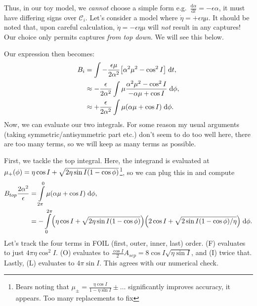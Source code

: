 \documentclass[11pt,
        usenames, %
        dvipsnames %
    ]{article}
\newcommand*{\rd}[2]{\frac{\mathrm{d}#1}{\mathrm{d}#2}}
\DeclarePairedDelimiter\p{\lparen}{\rparen}
\DeclarePairedDelimiter\s{\lbrack}{\rbrack}
\begin{document}
Thus, in our toy model, we \emph{cannot} choose a simple form e.g.\
$\rd{\alpha}{t} = -\epsilon\alpha$, it must have differing signs over
$\mathcal{C}_i$. Let's consider a model where $\dot{\eta} = +\epsilon \eta \mu$.
It should be noted that, upon careful calculation, $\dot{\eta} = -\epsilon \eta
\mu$ will \emph{not} result in any captures! Our choice only permits captures
\emph{from top down}. We will see this below.

Our expression then becomes:
\begin{align*}
    B_i &= \int -\frac{\epsilon \mu}{2\alpha^2}\s*{
        \alpha^2 \mu^2 - \cos^2 I}\;\mathrm{d}t,\\
        &\approx -\frac{\epsilon}{2\alpha^2} \int
            \mu \frac{\alpha^2 \mu^2 - \cos^2 I}{
                -\alpha \mu + \cos I}\;\mathrm{d}\phi,\\
        &\approx +\frac{\epsilon}{2\alpha^2}\int
            \mu\p*{\alpha \mu + \cos I}\;\mathrm{d}\phi.
\end{align*}
Now, we can evaluate our two integrals. For some reason my usual arguments
(taking symmetric/antisymmetric part etc.) don't seem to do too well here, there
are too many terms, so we will keep as many terms as possible.

First, we tackle the top integral. Here, the integrand is evaluated at
$\mu_+(\phi) = \eta \cos I + \sqrt{2\eta \sin I\p*{1 - \cos \phi}}$\footnote{
Bears noting that $\mu_{\pm} = \frac{\eta \cos I}{1 - \eta \sin I} \pm \dots$
significantly improves accuracy, it appears. Too many replacements to fix}, so
we can plug this in and compute
\begin{align*}
    B_{top}\frac{2\alpha^2}{\epsilon} &= \int\limits_{2\pi}^{0}
            \mu(\alpha \mu + \cos I)\;\mathrm{d}\phi,\\
        &= -\int\limits_0^{2\pi}
            \p*{\eta \cos I + \sqrt{2\eta \sin I\p*{1 - \cos \phi}}}
                \p*{2\cos I + \sqrt{2\sin I\p*{1 - \cos \phi}/\eta}}
                \;\mathrm{d}\phi.
\end{align*}
Let's track the four terms in FOIL (first, outer, inner, last) order. (F)
evaluates to just $4\pi \eta \cos^2 I$. (O) evaluates to $\frac{\cos
I}{2}A_{sep} = 8\cos I\sqrt{\eta \sin I}$, and (I) twice that. Lastly, (L)
evaluates to $4\pi \sin I$. This agrees with our numerical check.
\end{document}
